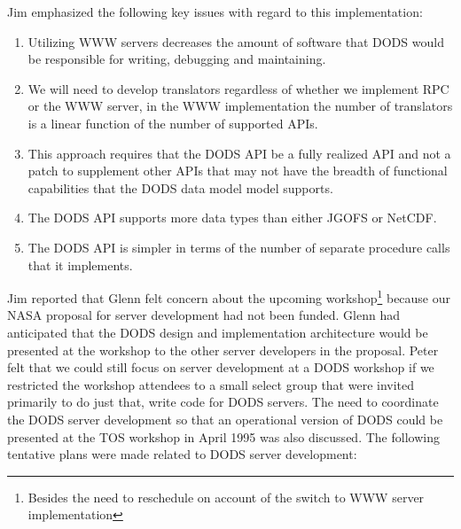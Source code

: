Jim emphasized the following key issues with regard to this implementation:

\begin{enumerate}
  \item  Utilizing WWW servers decreases the amount of software that DODS would
         be responsible for writing, debugging and maintaining. 
  \item  We will need to develop translators regardless of whether we
         implement RPC or the WWW server, in the WWW implementation
         the number of translators is a linear function of the number of
         supported APIs.
  \item  This approach requires that the DODS API be a fully realized API and
         not a patch to supplement other APIs that may not have the breadth
         of functional capabilities that the DODS data model model supports.
  \item  The DODS API supports more data types than either JGOFS or NetCDF.
  \item  The DODS API is simpler in terms of the number of separate procedure
         calls that it implements.
\end{enumerate}


Jim reported that Glenn felt concern about the upcoming
workshop\footnote{Besides the need to reschedule on account of the switch to
WWW server implementation} because our NASA proposal for server
development had not been funded.  Glenn had anticipated that the DODS design
and implementation architecture would be presented at the workshop to the
other server developers in the proposal.  Peter felt that we could still
focus on server development at a DODS workshop if we restricted the workshop
attendees to a small select group that were invited primarily to do just
that, write code for DODS servers.  The need to coordinate the DODS server
development so that an operational version of DODS could be presented at the
TOS workshop in April 1995 was also discussed.  The following tentative plans
were made related to DODS server development:

